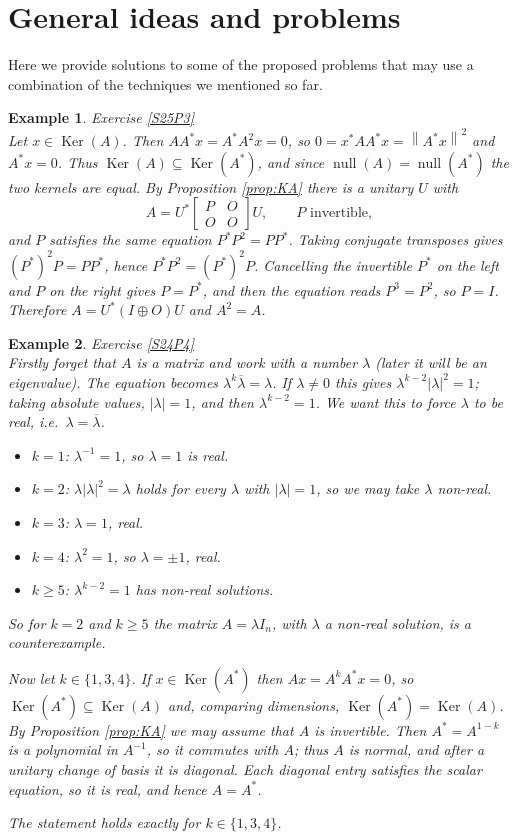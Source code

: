 \documentclass[12pt]{article}
\newcommand{\norm}[1]{\left\lVert #1 \right\rVert}
\DeclareMathOperator{\Null}{null}
\DeclareMathOperator{\Ker}{Ker}
\theoremstyle{breakplain}
\theoremstyle{breakdef}
\newtheorem*{example}{Example}
\theoremstyle{remark}
\begin{document}
\section{General ideas and problems}
Here we provide solutions to some of the proposed problems that may use a combination of the techniques we mentioned so far.
\begin{example}
    Exercise \ref{S25P3}\\
        Let $x\in \Ker(A)$. Then $AA^*x=A^*A^2x=0$, so $0=x^*AA^*x=\norm{A^*x}^2$ and $A^*x=0$. Thus $\Ker(A) \subseteq \Ker(A^*)$, and since $\Null(A)=\Null(A^*)$ the two kernels are equal. By Proposition \ref{prop:KA} there is a unitary $U$ with
        \[A=U^*\begin{bmatrix}
            P & O\\
            O & O
        \end{bmatrix}U,\qquad P \text{ invertible},\]
        and $P$ satisfies the same equation $P^*P^2=PP^*$. Taking conjugate transposes gives $(P^*)^2P=PP^*$, hence $P^*P^2=(P^*)^2P$. Cancelling the invertible $P^*$ on the left and $P$ on the right gives $P=P^*$, and then the equation reads $P^3=P^2$, so $P=I$. Therefore $A=U^*(I\oplus O)U$ and $A^2=A$.
\end{example}
\begin{example}
    Exercise \ref{S24P4}\\
    Firstly forget that $A$ is a matrix and work with a number $\lambda$ (later it will be an eigenvalue). The equation becomes $\lambda^k\overline{\lambda}=\lambda$. If $\lambda\neq0$ this gives $\lambda^{k-2}|\lambda|^2=1$; taking absolute values, $|\lambda|=1$, and then $\lambda^{k-2}=1$. We want this to force $\lambda$ to be real, i.e.\ $\lambda=\overline{\lambda}$.
    \begin{itemize}
        \item $k=1$: $\lambda^{-1}=1$, so $\lambda=1$ is real.
        \item $k=2$: $\lambda|\lambda|^2=\lambda$ holds for \emph{every} $\lambda$ with $|\lambda|=1$, so we may take $\lambda$ non-real.
        \item $k=3$: $\lambda=1$, real.
        \item $k=4$: $\lambda^2=1$, so $\lambda=\pm1$, real.
        \item $k\geq5$: $\lambda^{k-2}=1$ has non-real solutions.
    \end{itemize}
    So for $k=2$ and $k\geq5$ the matrix $A=\lambda I_n$, with $\lambda$ a non-real solution, is a counterexample.

    Now let $k\in\{1,3,4\}$. If $x\in \Ker(A^*)$ then $Ax=A^kA^*x=0$, so $\Ker(A^*)\subseteq\Ker(A)$ and, comparing dimensions, $\Ker(A^*)=\Ker(A)$. By Proposition \ref{prop:KA} we may assume that $A$ is invertible. Then $A^*=A^{1-k}$ is a polynomial in $A^{-1}$, so it commutes with $A$; thus $A$ is normal, and after a unitary change of basis it is diagonal. Each diagonal entry satisfies the scalar equation, so it is real, and hence $A=A^*$.

    The statement holds exactly for $k\in\{1,3,4\}$.
\end{example}
\end{document}
